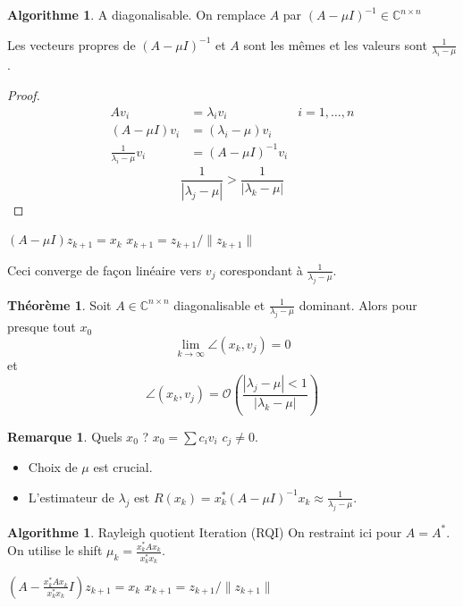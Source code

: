 \documentclass[11pt,a4paper]{article}
\newcommand{\C}{\mathbb{C}}
\newcommand{\Cnn}{\C^{n\times n}}
\theoremstyle{definition}
\newtheorem{myrem}[mydef]{Remarque}
\newtheorem{mytheo}[mydef]{Théorème}
\newtheorem{myalgo}[mydef]{Algorithme}
\newcommand{\bigoh}{\mathcal{O}}
\begin{document}
\begin{myalgo}
  A diagonalisable. On remplace $A$ par $(A-\mu I)^{-1} \in \Cnn$

  Les vecteurs propres de $(A - \mu I)^{-1}$ et $A$ sont les mêmes et les valeurs sont $\frac{1}{\lambda_i-\mu}$.
  \begin{proof}
    \begin{align*}
      Av_i & = \lambda_iv_i & i = 1,\ldots,n\\
      (A-\mu I)v_i & = (\lambda_i - \mu) v_i\\
      \frac{1}{\lambda_i - \mu} v_i & = (A - \mu I)^{-1}v_i
    \end{align*}
    $$\frac{1}{|\lambda_j - \mu|} > \frac{1}{|\lambda_k - \mu|}$$
  \end{proof}
  \begin{algorithm}
    \caption{INVIT ($x_0$ donné)}
    \label{algo:invit}
    \begin{algorithmic}
      \STATE $(A - \mu I)z_{k+1} = x_k$
      \STATE $x_{k+1} = z_{k+1}/\|z_{k+1}\|$
      \ENDFOR
    \end{algorithmic}
  \end{algorithm}
  Ceci converge de façon linéaire vers $v_j$ corespondant à $\frac{1}{\lambda_j - \mu}$.
\end{myalgo}
\begin{mytheo}
  Soit $A \in \Cnn$ diagonalisable et $\frac{1}{\lambda_j - \mu}$ dominant.
  Alors pour presque tout $x_0$
  $$\lim_{k\to\infty} \angle(x_k,v_j) = 0$$
  et
  $$\angle(x_k,v_j) = \bigoh\left(\frac{|\lambda_j - \mu| < 1}{|\lambda_k - \mu|}\right)$$
\end{mytheo}
\begin{myrem}
  Quels $x_0$ ? $x_0 = \sum c_i v_i$ $c_j \neq 0$.
  \begin{itemize}
    \item Choix de $\mu$ est crucial.
    \item L'estimateur de $\lambda_j$ est $R(x_k) = x_k^*(A - \mu I)^{-1}x_k \approx \frac{1}{\lambda_j - \mu}$.
  \end{itemize}
\end{myrem}

\begin{myalgo}{Rayleigh quotient Iteration (RQI)}
  On restraint ici pour $A = A^*$. On utilise le shift $\mu_k = \frac{x_k^*Ax_k}{x_k^*x_k}$.
  \begin{algorithm}
    \caption{RQI ($x_0$ donné) et normalisé (pour faire comme le syllabus, on est pas obligé)}
    \label{algo:rqi}
    \begin{algorithmic}
      \STATE $\left(A - \frac{x_k^*Ax_k}{x_k^*x_k} I\right)z_{k+1} = x_k$
      \STATE $x_{k+1} = z_{k+1}/\|z_{k+1}\|$
      \ENDFOR
    \end{algorithmic}
  \end{algorithm}
\end{myalgo}
\end{document}

